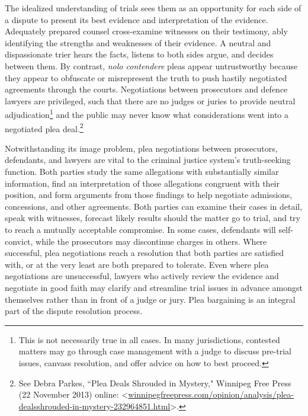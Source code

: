 The idealized understanding of trials sees them as an opportunity for each side of a dispute to present its best evidence and interpretation of the evidence. Adequately prepared counsel cross-examine witnesses on their testimony, ably identifying the strengths and weaknesses of their evidence. A neutral and dispassionate trier hears the facts, listens to both sides argue, and decides between them. By contrast, \textit{nolo contendere} pleas appear untrustworthy because they appear to obfuscate or misrepresent the truth to push hastily negotiated agreements through the courts. Negotiations between prosecutors and defence lawyers are privileged, such that there are no judges or juries to provide neutral adjudication\footnote{This is not necessarily true in all cases. In many jurisdictions, contested matters may go through case management with a judge to discuss pre-trial issues, canvass resolution, and offer advice on how to best proceed.} and the public may never know what considerations went into a negotiated plea deal.\footnote{See Debra Parkes, ``Plea Deals Shrouded in Mystery," Winnipeg Free Press (22 November 2013) online: \textless \url{winnipegfreepress.com/opinion/analysis/plea-dealsshrouded-in-mystery-232964851.html}\textgreater.}

Notwithstanding its image problem, plea negotiations between prosecutors, defendants, and lawyers are vital to the criminal justice system's truth-seeking function. Both parties study the same allegations with substantially similar information, find an interpretation of those allegations congruent with their position, and form arguments from those findings to help negotiate admissions, concessions, and other agreements. Both parties can examine their cases in detail, speak with witnesses, forecast likely results should the matter go to trial, and try to reach a mutually acceptable compromise. In some cases, defendants will self-convict, while the prosecutors may discontinue charges in others. Where successful, plea negotiations reach a resolution that both parties are satisfied with, or at the very least are both prepared to tolerate. Even where plea negotiations are unsuccessful, lawyers who actively review the evidence and negotiate in good faith may clarify and streamline trial issues in advance amongst themselves rather than in front of a judge or jury. Plea bargaining is an integral part of the dispute resolution process.


